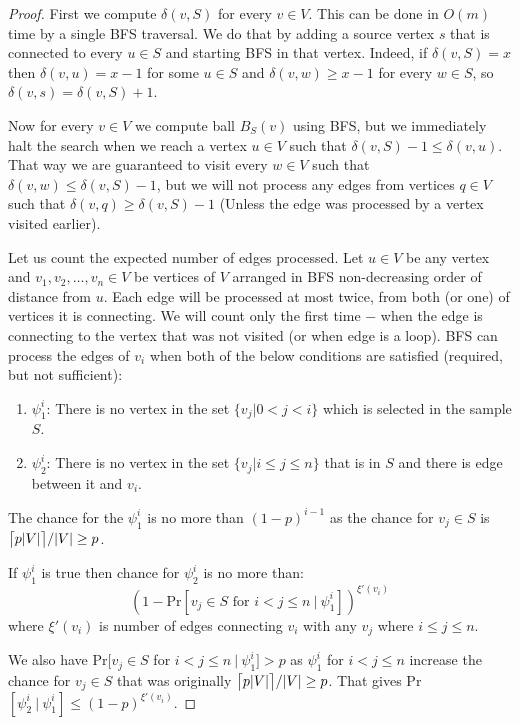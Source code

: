 \documentclass[shortabstract, lic, english]{iithesis}
\theoremstyle{definition} \newtheorem{definition}{Definition}[chapter]
\theoremstyle{plain} \newtheorem{remark}[definition]{Observation}
\theoremstyle{plain} \newtheorem{theorem}[definition]{Theorem}
\theoremstyle{plain} \newtheorem{lemma}[definition]{Lemma}
\theoremstyle{plain} \newtheorem{conjecture}[definition]{Conjecture}
\DeclarePairedDelimiter{\ceil}{\lceil}{\rceil}
\begin{document}
\begin{proof}
    First we compute $\delta(v, S)$ for every $v \in V$. This can be done in $O(m)$ time by a single BFS traversal.
    We do that by adding a source vertex $s$ that is connected to every $u \in S$ and starting BFS in that vertex.
    Indeed, if $\delta(v, S) = x$ then $\delta(v, u) = x - 1$ for some $u \in S$ and $\delta(v, w) \geq x - 1$ for every $w \in S$, so
    $\delta(v, s) = \delta(v, S) + 1$.

    Now for every $v \in V$ we compute ball $B_{S}(v)$ using BFS, but we immediately halt the search when we reach a vertex $u \in V$ such that $\delta(v,S) - 1 \leq \delta(v, u)$.
    That way we are guaranteed to visit every $w \in V$ such that $\delta(v, w) \leq \delta(v, S) - 1$, but
    we will not process any edges from vertices $q \in V$ such that $\delta(v, q) \geq \delta(v, S) - 1$ (Unless the edge was processed by a vertex visited earlier).

    Let us count the expected number of edges processed. Let $u \in V$ be any vertex and
    $v_1, v_2, \ldots, v_n \in V$ be vertices of $V$ arranged in BFS non-decreasing order of distance from $u$.
    Each edge will be processed at most twice, from both (or one) of vertices it is connecting. We will count only the first time $-$ when the edge is connecting to the vertex that was not visited (or when edge is a loop).
    BFS can process the edges of $v_i$ when both of the below conditions are satisfied (required, but not sufficient):
    \begin{enumerate}
        \item $\psi_1^i$: There is no vertex in the set $\{v_j |0 < j < i\}$ which is selected in the sample $S$.
        \item $\psi_2^i$: There is no vertex in the set $\{v_j |i \leq j \leq n\}$ that is in $S$ and there is edge between it and $v_i$.
    \end{enumerate} 
    The chance for the $\psi_1^i$ is no more than $(1-p)^{i-1}$ as the chance for $v_j \in S$ is $\ceil[\big]{p  |V|}/|V| \geq p$.
    
    If $\psi_1^i$ is true then chance for $\psi_2^i$ is no more than:
    $$(1 - \text{Pr}[v_j \in S \text{ for } i < j \leq n ~|~ \psi_1^i])^{\xi'(v_i)}$$
    where $\xi'(v_i)$ is number of edges connecting $v_i$ with any $v_j$ where $i \leq j \leq n$.

    We also have Pr$[v_j \in S $ for $i < j \leq n ~|~ \psi_1^i] > p$ as $\psi_1^i$ for $i < j \leq n$ increase the chance for $v_j \in S$ that was originally $\ceil[\big]{p  |V|}/|V| \geq p$.
    That gives Pr$[\psi_2^i ~|~ \psi_1^i] \leq (1-p)^{\xi'(v_i)}$.


\end{proof}
\end{document}
